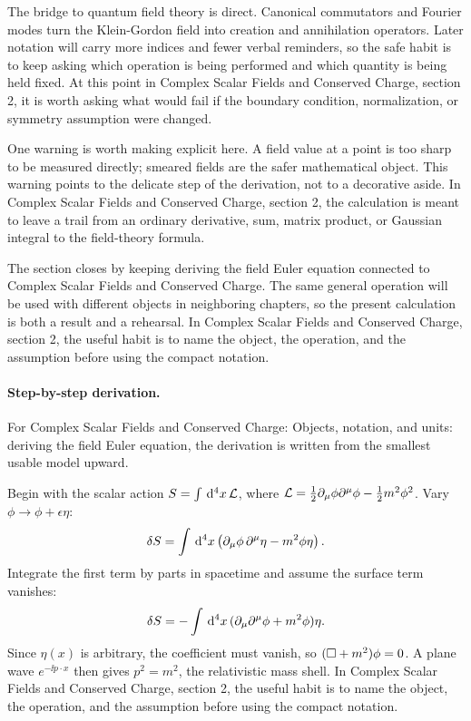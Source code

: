 The bridge to quantum field theory is direct.  Canonical commutators and Fourier modes turn the Klein-Gordon field into creation and annihilation operators.  Later notation will carry more indices and fewer verbal reminders, so the safe habit is to keep asking which operation is being performed and which quantity is being held fixed.  At this point in Complex Scalar Fields and Conserved Charge, section 2, it is worth asking what would fail if the boundary condition, normalization, or symmetry assumption were changed.

One warning is worth making explicit here.  A field value at a point is too sharp to be measured directly; smeared fields are the safer mathematical object.  This warning points to the delicate step of the derivation, not to a decorative aside.  In Complex Scalar Fields and Conserved Charge, section 2, the calculation is meant to leave a trail from an ordinary derivative, sum, matrix product, or Gaussian integral to the field-theory formula.

The section closes by keeping deriving the field Euler equation connected to Complex Scalar Fields and Conserved Charge.  The same general operation will be used with different objects in neighboring chapters, so the present calculation is both a result and a rehearsal.  In Complex Scalar Fields and Conserved Charge, section 2, the useful habit is to name the object, the operation, and the assumption before using the compact notation.



\paragraph{Step-by-step derivation.}

For Complex Scalar Fields and Conserved Charge: Objects, notation, and units: deriving the field Euler equation, the derivation is written from the smallest usable model upward.

Begin with the scalar action \(S=\int\,\mathrm d^4x\,\mathcal L\), where \(\mathcal L=\frac12\partial_\mu\phi\partial^\mu\phi-\frac12m^2\phi^2\).  Vary \(\phi\to\phi+\epsilon\eta\):
\[
  \delta S=\int\,\mathrm d^4x\left(\partial_\mu\phi\,\partial^\mu\eta-m^2\phi\eta\right).
\]
Integrate the first term by parts in spacetime and assume the surface term vanishes:
\[
  \delta S=-\int\,\mathrm d^4x\,(\partial_\mu\partial^\mu\phi+m^2\phi)\eta.
\]
Since \(\eta(x)\) is arbitrary, the coefficient must vanish, so \((\Box+m^2)\phi=0\).  A plane wave \(e^{-\ii p\cdot x}\) then gives \(p^2=m^2\), the relativistic mass shell.  In Complex Scalar Fields and Conserved Charge, section 2, the useful habit is to name the object, the operation, and the assumption before using the compact notation.

